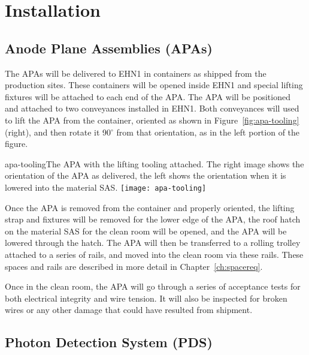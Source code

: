 
\section{Installation}


\subsection{Anode Plane Assemblies (APAs)}

The APAs will be delivered to EHN1 in containers as shipped from the production sites.  These containers will be opened inside EHN1 and special lifting fixtures will be attached to each end of the APA.  The APA will be positioned and attached to two conveyances installed in EHN1.  Both conveyances will used to lift the APA from the container, oriented as shown in Figure~\ref{fig:apa-tooling} (right), and then rotate it 90$^\circ$ from that orientation, as in the left portion of the figure.

\begin{cdrfigure}{apa-tooling}{The APA with the lifting tooling attached.  The right image shows the orientation of the APA as delivered, the left shows the orientation when it is lowered into the material SAS. }
\texttt{[image: apa-tooling]}
\end{cdrfigure}

Once the APA is removed from the container and properly oriented, the lifting strap and fixtures will be removed for the lower edge of the APA, the roof hatch on the material SAS for 
 the clean room will be opened, and the APA will be lowered through the hatch.  The APA will then be transferred to a rolling trolley attached to a series of rails, and moved into the clean room via these rails.  These spaces and rails are described in more detail in Chapter~\ref{ch:spacereq}. 

Once in the clean room, the APA will go through a series of acceptance tests for both electrical integrity and wire tension.  It will also be inspected for broken wires or any other damage that could have resulted from shipment.  

\subsection{Photon Detection System (PDS)}

